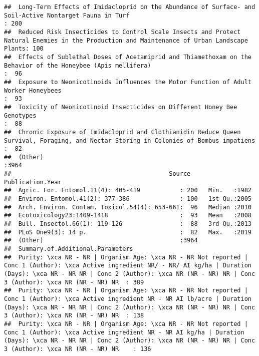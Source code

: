 \documentclass[
  12pt,
]{article}
\begin{document}
\begin{verbatim}
##  Long-Term Effects of Imidacloprid on the Abundance of Surface- and Soil-Active Nontarget Fauna in Turf                                    : 200  
##  Reduced Risk Insecticides to Control Scale Insects and Protect Natural Enemies in the Production and Maintenance of Urban Landscape Plants: 100  
##  Effects of Sublethal Doses of Acetamiprid and Thiamethoxam on the Behavior of the Honeybee (Apis mellifera)                               :  96  
##  Exposure to Neonicotinoids Influences the Motor Function of Adult Worker Honeybees                                                        :  93  
##  Toxicity of Neonicotinoid Insecticides on Different Honey Bee Genotypes                                                                   :  88  
##  Chronic Exposure of Imidacloprid and Clothianidin Reduce Queen Survival, Foraging, and Nectar Storing in Colonies of Bombus impatiens     :  82  
##  (Other)                                                                                                                                   :3964  
##                                            Source     Publication.Year
##  Agric. For. Entomol.11(4): 405-419           : 200   Min.   :1982    
##  Environ. Entomol.41(2): 377-386              : 100   1st Qu.:2005    
##  Arch. Environ. Contam. Toxicol.54(4): 653-661:  96   Median :2010    
##  Ecotoxicology23:1409-1418                    :  93   Mean   :2008    
##  Bull. Insectol.66(1): 119-126                :  88   3rd Qu.:2013    
##  PLoS One9(3): 14 p.                          :  82   Max.   :2019    
##  (Other)                                      :3964                   
##  Summary.of.Additional.Parameters                                                                                                                                                                                                                       
##  Purity: \xca NR - NR | Organism Age: \xca NR - NR Not reported | Conc 1 (Author): \xca Active ingredient NR/ - NR/ AI kg/ha | Duration (Days): \xca NR - NR NR | Conc 2 (Author): \xca NR (NR - NR) NR | Conc 3 (Author): \xca NR (NR - NR) NR  : 389  
##  Purity: \xca NR - NR | Organism Age: \xca NR - NR Not reported | Conc 1 (Author): \xca Active ingredient NR - NR AI lb/acre | Duration (Days): \xca NR - NR NR | Conc 2 (Author): \xca NR (NR - NR) NR | Conc 3 (Author): \xca NR (NR - NR) NR  : 138  
##  Purity: \xca NR - NR | Organism Age: \xca NR - NR Not reported | Conc 1 (Author): \xca Active ingredient NR - NR AI kg/ha | Duration (Days): \xca NR - NR NR | Conc 2 (Author): \xca NR (NR - NR) NR | Conc 3 (Author): \xca NR (NR - NR) NR    : 136  

\end{verbatim}
\end{document}
